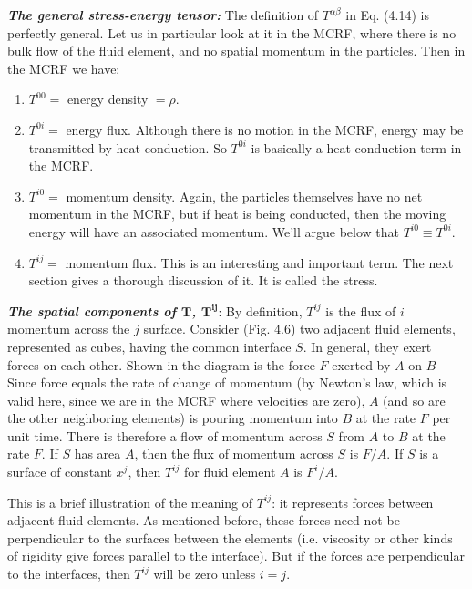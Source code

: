 \documentclass[12pt]{book}
\begin{document}
    \textbf{\textit{The general stress-energy tensor:}}
    The definition of \(T^{\alpha\beta}\) in Eq. (4.14) is perfectly general. Let us in particular look at it in the MCRF, where there is no bulk flow of the fluid element, and no spatial momentum in the particles. Then in the MCRF we have:

    \begin{enumerate}
        \item \(T^{00} = \) energy density \(= \rho\).
        \item \(T^{0i} = \) energy flux. Although there is no motion in the MCRF, energy may be transmitted by heat conduction. So \(T^{0i}\) is basically a heat-conduction term in the MCRF.
        \item \(T^{i0} = \) momentum density. Again, the particles themselves have no net momentum in the MCRF, but if heat is being conducted, then the moving energy will have an associated momentum. We’ll argue below that \(T^{i0} \equiv T^{0i}\).
        \item \(T^{ij} = \) momentum flux. This is an interesting and important term. The next section gives a thorough discussion of it. It is called the stress.
    \end{enumerate}

    \textbf{\textit{The spatial components of \(\mathbf{T}\), \(\mathbf{T^{ij}}\)}}: By definition, \(T^{ij}\) is the flux of \(i\) momentum across the \(j\) surface. Consider (Fig. 4.6) two adjacent fluid elements, represented as cubes, having the common interface \(S\). In general, they exert forces on each other. Shown in the diagram is the force \(F\) exerted by \(A\) on \(B\) Since force equals the rate of change of momentum (by Newton’s law, which is valid here, since we are in the MCRF where velocities are zero), \(A\) (and so are the other neighboring elements) is pouring momentum into \(B\) at the rate \(F\) per unit time.  There is therefore a flow of momentum across \(S\) from \(A\) to \(B\) at the rate \(F\). If \(S\) has area \(A\), then the flux of momentum across \(S\) is \(F/A\). If \(S\) is a surface of constant \(x^j\), then \(T^{ij}\) for fluid element \(A\) is \(F^i / A\).

    This is a brief illustration of the meaning of \(T^{ij}\): it represents forces between adjacent fluid elements. As mentioned before, these forces need not be perpendicular to the surfaces between the elements (i.e. viscosity or other kinds of rigidity give forces parallel to the interface). But if the forces are perpendicular to the interfaces, then \(T^{ij}\) will be zero unless \(i = j\). 
\end{document}

